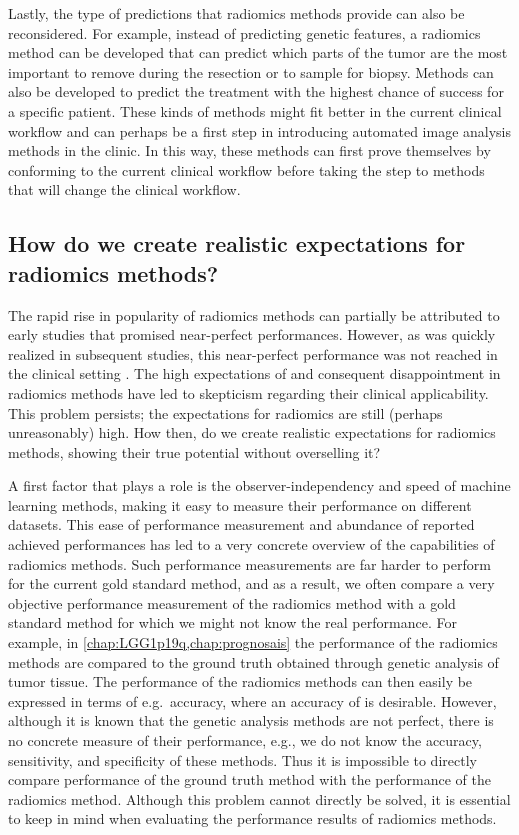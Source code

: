 Lastly, the type of predictions that radiomics methods provide can also be reconsidered.
For example, instead of predicting genetic features, a radiomics method can be developed that can predict which parts of the \gls{tumor} are the most important to remove during the resection or to sample for biopsy.
Methods can also be developed to predict the treatment with the highest chance of success for a specific patient.
These kinds of methods might fit better in the current clinical workflow and can perhaps be a first step in introducing automated image analysis methods in the clinic.
In this way, these methods can first prove themselves by conforming to the current clinical workflow before taking the step to methods that will change the clinical workflow.

\subsection{How do we create realistic expectations for radiomics methods?}

The rapid rise in popularity of radiomics methods can partially be attributed to early studies that promised near-perfect performances.
However, as was quickly realized in subsequent studies, this near-perfect performance was not reached in the clinical setting \autocite{gillies2016radiomics}.
The high expectations of and consequent disappointment in radiomics methods have led to skepticism regarding their clinical applicability.
This problem persists; the expectations for radiomics are still (perhaps unreasonably) high.
How then, do we create realistic expectations for radiomics methods, showing their true potential without overselling it?

A first factor that plays a role is the observer-independency and speed of machine learning methods, making it easy to measure their performance on different datasets.
This ease of performance measurement and abundance of reported achieved performances has led to a very concrete overview of the capabilities of radiomics methods.
Such performance measurements are far harder to perform for the current gold standard method, and as a result, we often compare a very objective performance measurement of the radiomics method with a gold standard method for which we might not know the real performance.
For example, in \cref{chap:LGG1p19q,chap:prognosais} the performance of the radiomics methods are compared to the ground truth obtained through genetic analysis of \gls{tumor} tissue.
The performance of the radiomics methods can then easily be expressed in terms of e.g.\ accuracy, where an accuracy of  is desirable.
However, although it is known that the genetic analysis methods are not perfect, there is no concrete measure of their performance, e.g., we do not know the accuracy, sensitivity, and specificity of these methods.
Thus it is impossible to directly compare performance of the ground truth method with the performance of the radiomics method.
Although this problem cannot directly be solved, it is essential to keep in mind when evaluating the performance results of radiomics methods.

